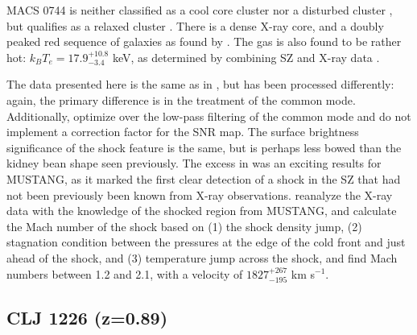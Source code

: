 
MACS 0744 is neither classified as a cool core cluster nor a disturbed cluster \citep{mann2012,sayers2013}, but qualifies
as a relaxed cluster \citep{mann2012}. There is a dense X-ray core, and a doubly peaked red sequence of galaxies as found
by \citet{kartaltepe2008}. The gas is also found to be rather hot: $k_B T_e = 17.9_{-3.4}^{+10.8}$ keV, as determined by combining
SZ and X-ray data \citep{laroque2003}. 

The data presented here is the same as in \citet{korngut2011}, but has been processed differently: again, the primary difference
is in the treatment of the common mode. Additionally, \citet{korngut2011} optimize over the low-pass filtering of the common mode
and do not implement a correction factor for the SNR map. The surface brightness significance of the shock feature is the same, 
but is perhaps less
bowed than the kidney bean shape seen previously.  The excess in \citet{korngut2011} was an exciting results for MUSTANG, 
as it marked the first clear detection of a shock in the SZ that had not been previously been known from X-ray observations. 
\citet{korngut2011}
reanalyze the X-ray data with the knowledge of the shocked region from MUSTANG, and calculate the Mach number of the shock
based on (1) the shock density jump, (2) stagnation condition between the pressures at the edge of the cold front and just
ahead of the shock, and (3) temperature jump across the shock, and find Mach numbers between 1.2 and 2.1, with
a velocity of $1827_{-195}^{+267}$ km s$^{-1}$.




\subsection{CLJ 1226 (z=0.89)}
\label{sec:results_clj1226}

